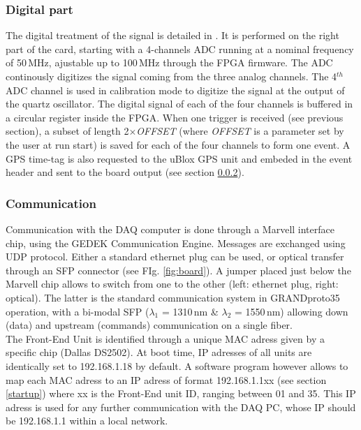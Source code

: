 \subsubsection{Digital part}
\label{digital}
The digital treatment of the signal is detailed in \cite{GP35daq}. It is performed on the right part of the card, starting with a 4-channels ADC \cite{ADCdoc} running at a nominal frequency of 50\,MHz, ajustable up to 100\,MHz through the FPGA firmware. The ADC continously digitizes the signal coming from the three analog channels. The 4$^{th}$ ADC channel is used in calibration mode to digitize the signal at the output of the quartz oscillator. The digital signal of each of the four channels is buffered in a circular register inside the FPGA. When one trigger is received (see previous section), a subset of length 2$\times${\it OFFSET} (where {\it OFFSET} is a parameter set by the user at run start) is saved for each of the four channels to form one event. A GPS time-tag is also requested to the uBlox GPS unit\cite{GPS} and embeded in the event header and sent to the board output (see section \ref{comms}).

\subsubsection{Communication}
\label{comms}
Communication with the DAQ computer is done through a Marvell interface chip, using the GEDEK Communication Engine. Messages are exchanged using UDP protocol. Either a standard ethernet plug can be used, or optical transfer through an SFP connector (see FIg. \ref{fig:board}). A jumper placed just below the Marvell chip allows to switch from one to the other (left: ethernet plug, right: optical). The latter is the standard communication system in GRANDproto35 operation, with a bi-modal SFP ($\lambda_1$ = 1310\,nm \& $\lambda_2$ = 1550\,nm) allowing down (data) and upstream (commands) communication on a single fiber. \\
%
The Front-End Unit is identified through a unique MAC adress given by a specific chip (Dallas DS2502). At boot time, IP adresses of all units are identically set to 192.168.1.18 by default.  A software program however allows to map each MAC adress to an IP adress of format 192.168.1.1xx (see section \ref{startup}) where xx is the Front-End unit ID, ranging between 01 and 35. This IP adress is used for any further communication with the DAQ PC, whose IP should be 192.168.1.1 within a local network.


